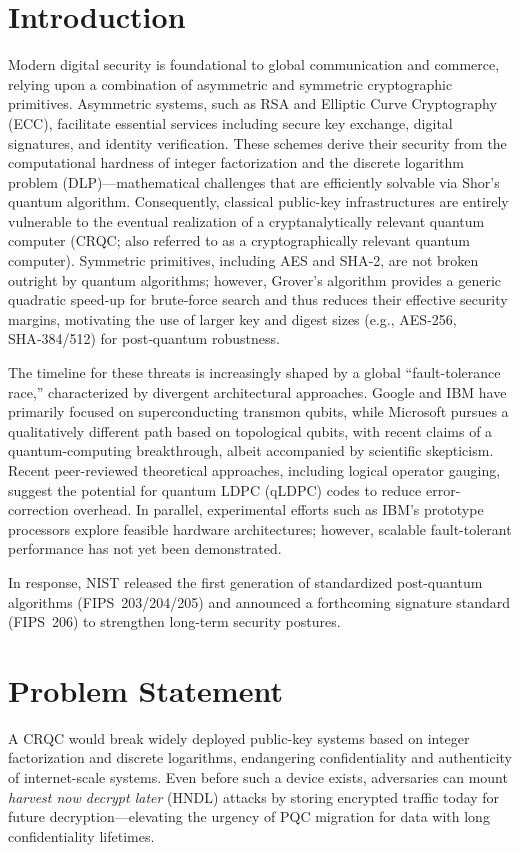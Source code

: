 \documentclass[11pt,a4paper]{article}
\begin{document}
\section{Introduction}
Modern digital security is foundational to global communication and commerce, relying upon a combination of asymmetric and symmetric cryptographic primitives. Asymmetric systems, such as RSA and Elliptic Curve Cryptography (ECC), facilitate essential services including secure key exchange, digital signatures, and identity verification. These schemes derive their security from the computational hardness of integer factorization and the discrete logarithm problem (DLP)—mathematical challenges that are efficiently solvable via Shor’s quantum algorithm. Consequently, classical public-key infrastructures are entirely vulnerable to the eventual realization of a cryptanalytically relevant quantum computer (CRQC; also referred to as a cryptographically relevant quantum computer).\cite{shor1997,regev2024,ijonest_crqc} Symmetric primitives, including AES and SHA‑2, are not broken outright by quantum algorithms; however, Grover’s algorithm provides a generic quadratic speed‑up for brute‑force search and thus reduces their effective security margins, motivating the use of larger key and digest sizes (e.g., AES‑256, SHA‑384/512) for post‑quantum robustness. \cite{grover1996,ijqc_grover,postquantum_grover}

The timeline for these threats is increasingly shaped by a global “fault-tolerance race,” characterized by divergent architectural approaches. Google and IBM have primarily focused on superconducting transmon qubits, while Microsoft pursues a qualitatively different path based on topological qubits, with recent claims of a quantum-computing breakthrough, albeit accompanied by scientific skepticism.\cite{Microsoft2025,Microsoft2025c} Recent peer-reviewed theoretical approaches, including logical operator gauging, suggest the potential for quantum LDPC (qLDPC) codes to reduce error-correction overhead. In parallel, experimental efforts such as IBM’s prototype processors explore feasible hardware architectures; however, scalable fault-tolerant performance has not yet been demonstrated.\cite{IBM2025,IBM2025Loon}

In response, NIST released the first generation of standardized post-quantum algorithms (FIPS~203/204/205) and announced a forthcoming signature standard (FIPS~206) to strengthen long-term security postures.\cite{nist203,nist204,nist205,fips206status}

\section{Problem Statement}
A CRQC would break widely deployed public-key systems based on integer factorization and discrete logarithms, endangering confidentiality and authenticity of internet-scale systems.\cite{nist_crqc,cisa_crqc,ijonest_crqc} Even before such a device exists, adversaries can mount \emph{harvest now decrypt later} (HNDL) attacks by storing encrypted traffic today for future decryption—elevating the urgency of PQC migration for data with long confidentiality lifetimes.\cite{hndl-fed}
\end{document}
